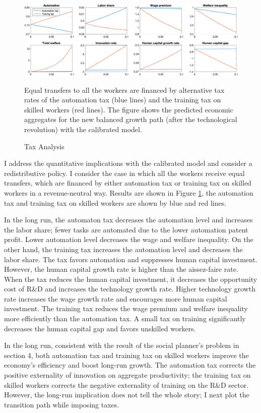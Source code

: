 \documentclass[12pt]{article}
\begin{document}
\begin{figure}[h!]
\includegraphics[width = \textwidth]{Tax}
\caption{Tax Analysis}
\label{tax}
{\scriptsize Equal transfers to all the workers are financed by alternative tax rates of the automation tax (blue lines) and the training tax on skilled workers (red lines). The figure shows the predicted economic aggregates for the new balanced growth path (after the technological revolution) with the calibrated model.}
\end{figure}

I address the quantitative implications with the calibrated model and consider a redistributive policy. I consider the case in which all the workers receive equal transfers, which are financed by either automation tax or training tax on skilled workers in a revenue-neutral way. Results are shown in Figure \ref{tax}, the automation tax and training tax on skilled workers are shown by blue and red lines. 

In the long run, the automaton tax decreases the automation level and increases the labor share; fewer tasks are automated due to the lower automation patent profit. Lower automation level decreases the wage and welfare inequality. On the other hand, the training tax increases the automation level and decreases the labor share. The tax favors automation and suppresses human capital investment. However, the human capital growth rate is higher than the aissez-faire rate. When the tax reduces the human capital investment, it decreases the opportunity cost of R\&D and increases the technology growth rate. Higher technology growth rate increases the wage growth rate and encourages more human capital investment. The training tax reduces the wage premium and welfare inequality more efficiently than the automation tax. A small tax on training significantly decreases the human capital gap and favors unskilled workers. 

In the long run, consistent with the result of the social planner's problem in section 4, both automation tax and training tax on skilled workers improve the economy's efficiency and boost long-run growth. The automation tax corrects the positive externality of innovation on aggregate productivity; the training tax on skilled workers corrects the negative externality of training on the R\&D sector. However, the long-run implication does not tell the whole story; I next plot the transition path while imposing taxes.  
\end{document}
